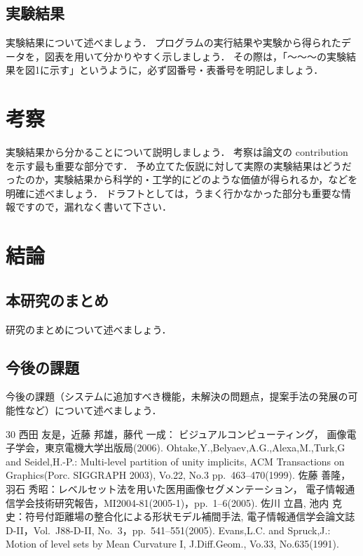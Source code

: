 \documentclass[uplatex,draft]{ipsjpapers}
\begin{document}
 \subsection{実験結果}
   実験結果について述べましょう．
   プログラムの実行結果や実験から得られたデータを，図表を用いて分かりやすく示しましょう．
   その際は，「～～～の実験結果を図1に示す」というように，必ず図番号・表番号を明記しましょう．
\section{考察}
 \label{sec:discussion}
 実験結果から分かることについて説明しましょう．
 考察は論文の contribution を示す最も重要な部分です．
 予め立てた仮説に対して実際の実験結果はどうだったのか，実験結果から科学的・工学的にどのような価値が得られるか，などを明確に述べましょう．
 ドラフトとしては，うまく行かなかった部分も重要な情報ですので，漏れなく書いて下さい．
\section{結論}
 \label{sec:conclusion}
 \subsection{本研究のまとめ}
   研究のまとめについて述べましょう．
 \subsection{今後の課題}
   今後の課題（システムに追加すべき機能，未解決の問題点，提案手法の発展の可能性など）について述べましょう．
   \begin{thebibliography} {30}
     西田 友是，近藤 邦雄，藤代 一成：
     ビジュアルコンピューティング，
     画像電子学会，東京電機大学出版局(2006).
     Ohtake,Y.,Belyaev,A.G.,Alexa,M.,Turk,G and Seidel,H.-P.:
     Multi-level partition of unity implicits,
     ACM Transactions on Graphics(Porc. SIGGRAPH 2003),
     Vo.22, No.3 pp.\ 463--470(1999).
     佐藤 善隆，羽石 秀昭：レベルセット法を用いた医用画像セグメンテーション，
     電子情報通信学会技術研究報告，MI2004-81(2005-1)，pp.\ 1--6(2005).
     佐川 立昌, 池内 克史：符号付距離場の整合化による形状モデル補間手法,
     電子情報通信学会論文誌 D-II，Vol.~J88-D-II, No.~3，pp.\ 541--551(2005).
     Evans,L.C. and Spruck,J.:
     Motion of level sets by Mean Curvature I,
     J.Diff.Geom., Vo.33, No.635(1991).
   \end{thebibliography}
   \appendix
\end{document}
